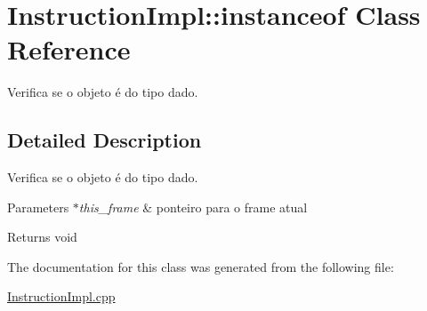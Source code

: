 \hypertarget{class_instruction_impl_1_1instanceof}{}\section{Instruction\+Impl\+:\+:instanceof Class Reference}
\label{class_instruction_impl_1_1instanceof}


Verifica se o objeto é do tipo dado.  




\subsection{Detailed Description}
Verifica se o objeto é do tipo dado. 


\begin{DoxyParams}{Parameters}
{\em $\ast$this\+\_\+frame} & ponteiro para o frame atual \\
\hline
\end{DoxyParams}
\begin{DoxyReturn}{Returns}
void 
\end{DoxyReturn}


The documentation for this class was generated from the following file\+:\begin{DoxyCompactItemize}
\item 
\hyperlink{_instruction_impl_8cpp}{Instruction\+Impl.\+cpp}\end{DoxyCompactItemize}
